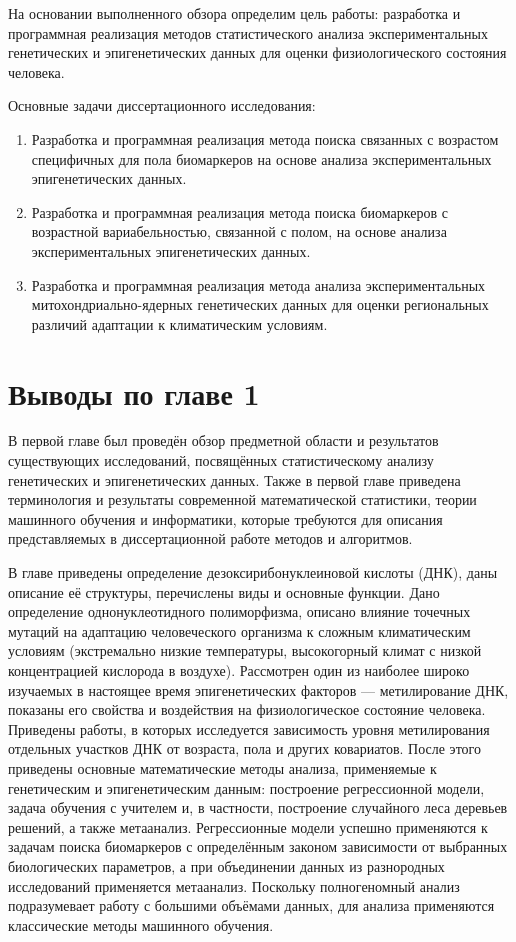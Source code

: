 На основании выполненного обзора определим цель работы: разработка и программная реализация методов статистического анализа экспериментальных генетических и эпигенетических данных для оценки физиологического состояния человека.

Основные задачи диссертационного исследования:
\begin{enumerate}
	\item Разработка и программная реализация метода поиска связанных с возрастом специфичных для пола биомаркеров на основе анализа экспериментальных эпигенетических данных.
	\item Разработка и программная реализация метода поиска биомаркеров с возрастной вариабельностью, связанной с полом, на основе анализа экспериментальных эпигенетических данных. 
	\item Разработка и программная реализация метода анализа экспериментальных митохондриально-ядерных генетических данных для оценки региональных различий адаптации к климатическим условиям. 
\end{enumerate}

\section*{Выводы по главе 1} \label{sec:ch1/conclusion}                       

В первой главе был проведён обзор предметной области и результатов существующих исследований, посвящённых статистическому анализу генетических и эпигенетических данных. Также в первой главе приведена терминология и результаты современной математической статистики, теории машинного обучения и информатики, которые требуются для описания представляемых в диссертационной работе методов и алгоритмов.

В главе приведены определение дезоксирибонуклеиновой кислоты (ДНК), даны описание её структуры, перечислены виды и основные функции. Дано определение однонуклеотидного полиморфизма, описано влияние точечных мутаций на адаптацию человеческого организма к сложным климатическим условиям (экстремально низкие температуры, высокогорный климат с низкой концентрацией кислорода в воздухе). Рассмотрен один из наиболее широко изучаемых в настоящее время эпигенетических факторов --- метилирование ДНК, показаны его свойства и воздействия на физиологическое состояние человека. Приведены работы, в которых исследуется зависимость уровня метилирования отдельных участков ДНК от возраста, пола и других ковариатов. После этого приведены основные математические методы анализа, применяемые к генетическим и эпигенетическим данным: построение регрессионной модели, задача обучения с учителем и, в частности, построение случайного леса деревьев решений, а также метаанализ. Регрессионные модели успешно применяются к задачам поиска биомаркеров с определённым законом зависимости от выбранных биологических параметров, а при объединении данных из разнородных исследований применяется метаанализ. Поскольку полногеномный анализ подразумевает работу с большими объёмами данных, для анализа применяются классические методы машинного обучения.

